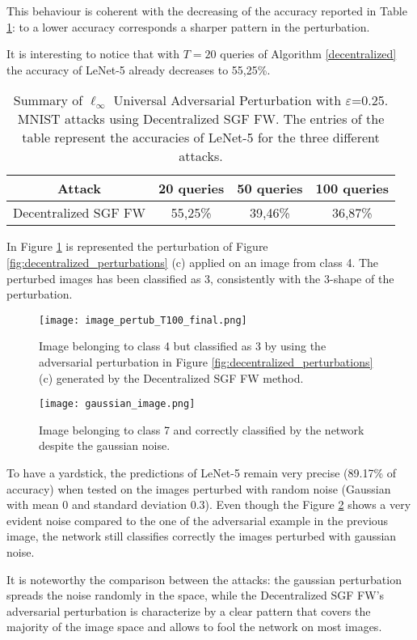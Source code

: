 This behaviour is coherent with the decreasing of the accuracy reported in Table \ref{tab:decentralized}: to a lower accuracy corresponds a sharper pattern in the perturbation.

It is interesting to notice that with $T=20$ queries of Algorithm \ref{decentralized} the accuracy of LeNet-5 already decreases to 55,25\%.
\begin{table}[htbp]
	\begin{center}
		\begin{adjustwidth}{-.6cm}{}
			\begin{tabular}{c|ccc}
				\textbf{Attack} &          20 \textbf{queries} &      50 \textbf{queries} &     100 \textbf{queries} \\
				\midrule
				{\small Decentralized SGF FW}     &    55,25\% &    39,46\% &       36,87\% \\
			\end{tabular}
		\end{adjustwidth}
	\end{center}
	\caption{{\small  Summary of $\ell_\infty$ Universal Adversarial Perturbation with $\varepsilon$=0.25. MNIST attacks using Decentralized SGF FW. The entries of the table represent the accuracies of LeNet-5 for the three different attacks.}}
	\label{tab:decentralized}
\end{table}

In Figure \ref{fig:decentralized} is represented the perturbation of Figure \ref{fig:decentralized_perturbations} (c) applied on an image from class 4. The perturbed images has been classified as 3, consistently with the 3-shape of the perturbation.
\begin{figure}[htbp]
	\centering
	\texttt{[image: image\_pertub\_T100\_final.png]}
	\caption{{\small Image belonging to class 4 but classified as 3 by using the adversarial perturbation in Figure \ref{fig:decentralized_perturbations} (c) generated by the Decentralized SGF FW method.}}
	\label{fig:decentralized}
\end{figure}
\begin{figure}[htbp]
	\centering
	\texttt{[image: gaussian\_image.png]}
	\caption{{\small Image belonging to class 7 and correctly classified by the network despite the gaussian noise.}}
	\label{fig:gaussian_noise}
\end{figure}
To have a yardstick, the predictions of LeNet-5 remain very precise (89.17\% of accuracy) when tested on the images perturbed with random noise (Gaussian with mean 0 and standard deviation 0.3). Even though the Figure \ref{fig:gaussian_noise} shows a very evident noise compared to the one of the adversarial example in the previous image, the network still classifies correctly the images perturbed with gaussian noise.

It is noteworthy the comparison between the attacks: the gaussian perturbation spreads the noise randomly in the space, while the Decentralized SGF FW's adversarial perturbation is characterize by a clear pattern that covers the majority of the image space and allows to fool the network on most images.